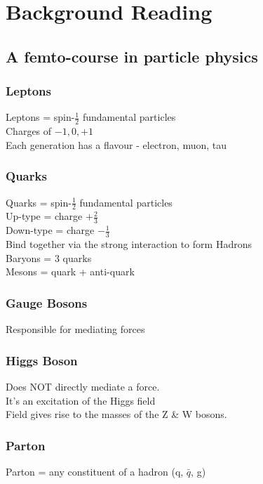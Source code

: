 \documentclass[11pt]{article}
\newcommand{\<}{\guilsinglleft}
\renewcommand{\>}{\guilsinglright}
\begin{document}
    \section{Background Reading}

    \subsection{A femto-course in particle physics}

    \subsubsection{Leptons}
    Leptons = spin-$\frac{1}{2}$ fundamental particles\\
    Charges of $-1, 0, +1$\\
    Each generation has a flavour -  electron, muon, tau

    \subsubsection{Quarks}
    Quarks = spin-$\frac{1}{2}$ fundamental particles\\
    Up-type = charge $+\frac{2}{3}$\\
    Down-type = charge $-\frac{1}{3}$\\
    Bind together via the strong interaction to form Hadrons\\
    Baryons = 3 quarks\\
    Mesons = quark + anti-quark

    \subsubsection{Gauge Bosons}
    Responsible for mediating forces

    \subsubsection{Higgs Boson}
    Does NOT directly mediate a force.\\
    It's an excitation of the Higgs field\\
    Field gives rise to the masses of the Z \& W bosons. \\

    \subsubsection{Parton}
    Parton = any constituent of a hadron (q, $\bar{q}$, g)
\end{document}
